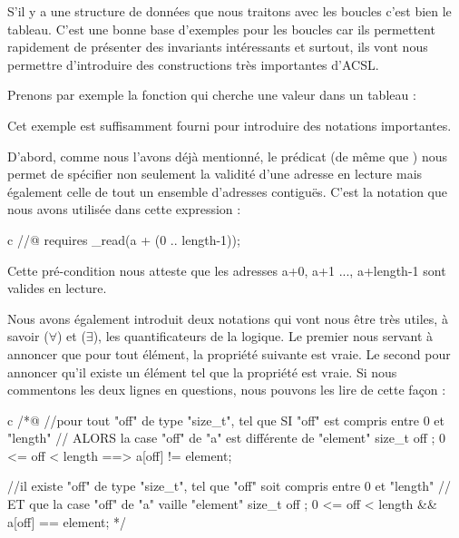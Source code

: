 

S'il y a une structure de données que nous traitons avec les boucles c'est bien
le tableau. C'est une bonne base d'exemples pour les boucles car ils permettent
rapidement de présenter des invariants intéressants et surtout, ils vont nous 
permettre d'introduire des constructions très importantes d'ACSL.



Prenons par exemple la fonction qui cherche une valeur dans un tableau :






Cet exemple est suffisamment fourni pour introduire des notations importantes.



D'abord, comme nous l'avons déjà mentionné, le prédicat  (de 
même que ) nous permet de spécifier non seulement la validité d'une 
adresse en lecture mais également celle de tout un ensemble d'adresses 
contiguës. C'est la notation que nous avons utilisée dans cette expression :



\begin{CodeBlock}{c}
//@ requires \valid_read(a + (0 .. length-1));
\end{CodeBlock}



Cette pré-condition nous atteste que les adresses a+0, a+1 ..., a+length-1 sont
valides en lecture.



Nous avons également introduit deux notations qui vont nous être très utiles, à 
savoir  ($\forall$) et  ($\exists$), les 
quantificateurs de la logique. Le premier nous servant à annoncer que pour tout
élément, la propriété suivante est vraie. Le second pour annoncer qu'il existe
un élément tel que la propriété est vraie. Si nous commentons les deux lignes en 
questions, nous pouvons les lire de cette façon :



\begin{CodeBlock}{c}
/*@
//pour tout "off" de type "size_t", tel que SI "off" est compris entre 0 et "length"
//                                 ALORS la case "off" de "a" est différente de "element"
\forall size_t off ; 0 <= off < length ==> a[off] != element;

//il existe "off" de type "size_t", tel que "off" soit compris entre 0 et "length"
//                                 ET que la case "off" de "a" vaille "element"
\exists size_t off ; 0 <= off < length && a[off] == element;
*/
\end{CodeBlock}



